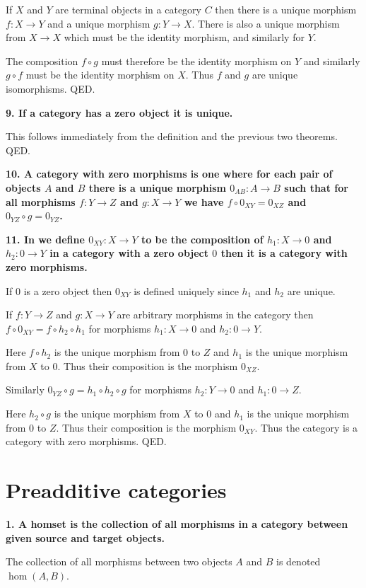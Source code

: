 \documentclass[12pt]{article}
\begin{document}
If $X$ and $Y$ are terminal objects in a category $C$ then there is a unique morphism $f : X \to Y$ and a unique morphism $g : Y \to X$. There is also a unique morphism from $X \to X$ which must be the identity morphism, and similarly for $Y$.

The composition $f\circ g$ must therefore be the identity morphism on $Y$ and similarly $g\circ f$ must be the identity morphism on $X$. Thus $f$ and $g$ are unique isomorphisms. QED.

\textbf{9. If a category has a zero object it is unique.}

This follows immediately from the definition and the previous two theorems. QED.

\textbf{10. A category with zero morphisms is one where for each pair of objects $A$ and $B$ there is a unique morphism $0_{AB} : A \to B$ such that for all morphisms $f : Y \to Z$ and $g : X \to Y$ we have $f\circ 0_{XY} = 0_{XZ}$ and $0_{YZ}\circ g = 0_{YZ}$.}

\textbf{11. In we define $0_{XY} : X \to Y$ to be the composition of $h_1 : X \to 0$ and $h_2 : 0 \to Y$ in a category with a zero object $0$ then it is a category with zero morphisms.}

If $0$ is a zero object then $0_{XY}$ is defined uniquely since $h_1$ and $h_2$ are unique.

If $f : Y \to Z$ and $g : X \to Y$ are arbitrary morphisms in the category then $f\circ 0_{XY} = f\circ h_2\circ h_1$ for morphisms $h_1 : X \to 0$ and $h_2 : 0 \to Y$.

Here $f\circ h_2$ is the unique morphism from $0$ to $Z$ and $h_1$ is the unique morphism from $X$ to $0$. Thus their composition is the morphism $0_{XZ}$.

Similarly $0_{YZ}\circ g = h_1\circ h_2\circ g$ for morphisms $h_2 : Y \to 0$ and $h_1 : 0 \to Z$.

Here $h_2\circ g$ is the unique morphism from $X$ to $0$ and $h_1$ is the unique morphism from $0$ to $Z$. Thus their composition is the morphism $0_{XY}$. Thus the category is a category with zero morphisms. QED.

\section{Preadditive categories}

\textbf{1. A homset is the collection of all morphisms in a category between given source and target objects.}

The collection of all morphisms between two objects $A$ and $B$ is denoted $\hom(A, B)$.
\end{document}
